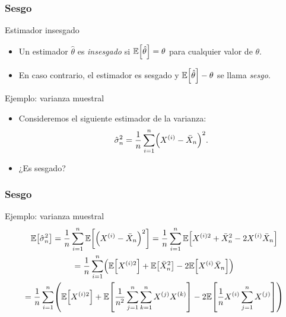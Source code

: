 \documentclass[table]{beamer}
\begin{document}
\begin{frame}
    \frametitle{Sesgo}
    \begin{block}{Estimador insesgado}
        \begin{itemize}
            \item Un estimador $\hat{\theta}$ es \emph{insesgado} si $\expected{\hat{\theta}} = \theta$ para cualquier valor de $\theta$.
            \item En caso contrario, el estimador es sesgado y $\expected{\hat{\theta}} - \theta$ se llama \emph{sesgo}.
        \end{itemize}
    \end{block}
    \begin{block}{Ejemplo: varianza muestral}
        \begin{itemize}
            \item Consideremos el siguiente estimador de la varianza:
                \begin{equation*}
                    \hat{\sigma}^{2}_{n} = \frac{1}{n} \sum_{i = 1}^{n} \parens{X^{\parens{i}} - \bar{X}_{n}}^{2} .
                \end{equation*}
            \item ¿Es sesgado?
        \end{itemize}
    \end{block}
\end{frame}

\begin{frame}
    \frametitle{Sesgo}
    \begin{block}{Ejemplo: varianza muestral}
        \begin{multline*}
            \expected{\hat{\sigma}^{2}_{n}} = \frac{1}{n} \sum_{i = 1}^{n} \expected{\parens{X^{\parens{i}} - \bar{X}_{n}}^{2}}
            = \frac{1}{n} \sum_{i = 1}^{n} \expected{X^{\parens{i} 2} + \bar{X}_{n}^{2} - 2 X^{\parens{i}} \bar{X}_{n}}
            \\
            = \frac{1}{n} \sum_{i = 1}^{n} \parens{\expected{X^{\parens{i} 2}} + \expected{\bar{X}_{n}^{2}} - 2 \expected{X^{\parens{i}} \bar{X}_{n}}}
            \\
            = \frac{1}{n} \sum_{i = 1}^{n} \parens{\expected{X^{\parens{i} 2}} + \expected{\frac{1}{n^{2}} \sum_{j = 1}^{n} \sum_{k = 1}^{n} X^{\parens{j}} X^{\parens{k}}} - 2 \expected{\frac{1}{n} X^{\parens{i}} \sum_{j = 1}^{n} X^{\parens{j}}}}
            \\
        \end{multline*}
    \end{block}
\end{frame}
\end{document}
